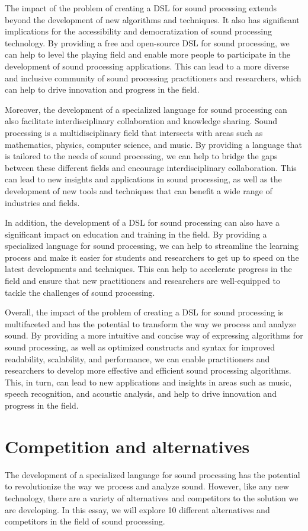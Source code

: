 The impact of the problem of creating a DSL for sound processing extends beyond the development of new algorithms and techniques. It also has significant implications for the accessibility and democratization of sound processing technology. By providing a free and open-source DSL for sound processing, we can help to level the playing field and enable more people to participate in the development of sound processing applications. This can lead to a more diverse and inclusive community of sound processing practitioners and researchers, which can help to drive innovation and progress in the field.

Moreover, the development of a specialized language for sound processing can also facilitate interdisciplinary collaboration and knowledge sharing. Sound processing is a multidisciplinary field that intersects with areas such as mathematics, physics, computer science, and music. By providing a language that is tailored to the needs of sound processing, we can help to bridge the gaps between these different fields and encourage interdisciplinary collaboration. This can lead to new insights and applications in sound processing, as well as the development of new tools and techniques that can benefit a wide range of industries and fields.

In addition, the development of a DSL for sound processing can also have a significant impact on education and training in the field. By providing a specialized language for sound processing, we can help to streamline the learning process and make it easier for students and researchers to get up to speed on the latest developments and techniques. This can help to accelerate progress in the field and ensure that new practitioners and researchers are well-equipped to tackle the challenges of sound processing.

Overall, the impact of the problem of creating a DSL for sound processing is multifaceted and has the potential to transform the way we process and analyze sound. By providing a more intuitive and concise way of expressing algorithms for sound processing, as well as optimized constructs and syntax for improved readability, scalability, and performance, we can enable practitioners and researchers to develop more effective and efficient sound processing algorithms. This, in turn, can lead to new applications and insights in areas such as music, speech recognition, and acoustic analysis, and help to drive innovation and progress in the field.

\section{Competition and alternatives } 
The development of a specialized language for sound processing has the potential to revolutionize the way we process and analyze sound. However, like any new technology, there are a variety of alternatives and competitors to the solution we are developing. In this essay, we will explore 10 different alternatives and competitors in the field of sound processing.

